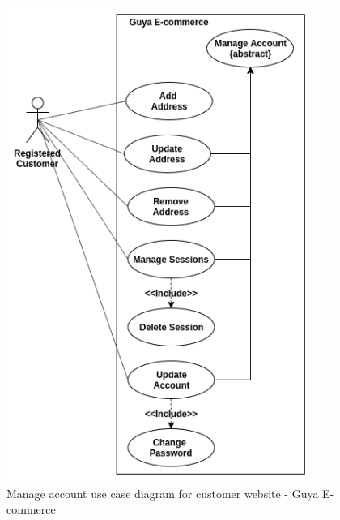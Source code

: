 \begin{figure}[!ht]
\centering
\includegraphics[width=10cm,keepaspectratio]{usecases/manage_account}
\caption{Manage account use case diagram for customer website - Guya E-commerce}
\end{figure}

